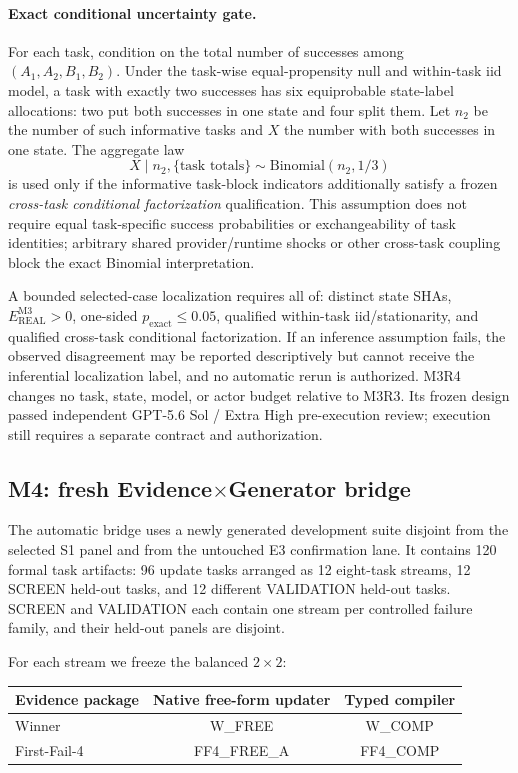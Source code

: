 \paragraph{Exact conditional uncertainty gate.}
For each task, condition on the total number of successes among $(A_1,A_2,B_1,B_2)$. Under the task-wise equal-propensity null and within-task iid model, a task with exactly two successes has six equiprobable state-label allocations: two put both successes in one state and four split them. Let $n_2$ be the number of such informative tasks and $X$ the number with both successes in one state. The aggregate law
\begin{equation}
X\mid n_2,\{\text{task totals}\}\sim\mathrm{Binomial}(n_2,1/3)
\end{equation}
is used only if the informative task-block indicators additionally satisfy a frozen \emph{cross-task conditional factorization} qualification. This assumption does not require equal task-specific success probabilities or exchangeability of task identities; arbitrary shared provider/runtime shocks or other cross-task coupling block the exact Binomial interpretation.

A bounded selected-case localization requires all of: distinct state SHAs, $E_{\mathrm{REAL}}^{\mathrm{M3}}>0$, one-sided $p_{\mathrm{exact}}\leq0.05$, qualified within-task iid/stationarity, and qualified cross-task conditional factorization. If an inference assumption fails, the observed disagreement may be reported descriptively but cannot receive the inferential localization label, and no automatic rerun is authorized. M3R4 changes no task, state, model, or actor budget relative to M3R3. Its frozen design passed independent GPT-5.6 Sol / Extra High pre-execution review; execution still requires a separate contract and authorization.

\subsection{M4: fresh Evidence$\times$Generator bridge}
The automatic bridge uses a newly generated development suite disjoint from the selected S1 panel and from the untouched E3 confirmation lane. It contains 120 formal task artifacts: 96 update tasks arranged as 12 eight-task streams, 12 SCREEN held-out tasks, and 12 different VALIDATION held-out tasks. SCREEN and VALIDATION each contain one stream per controlled failure family, and their held-out panels are disjoint.

For each stream we freeze the balanced $2\times2$:
\begin{center}
\begin{tabular}{lcc}
\toprule
Evidence package & Native free-form updater & Typed compiler \\
\midrule
Winner & W\_FREE & W\_COMP \\
First-Fail-4 & FF4\_FREE\_A & FF4\_COMP \\
\bottomrule
\end{tabular}
\end{center}


